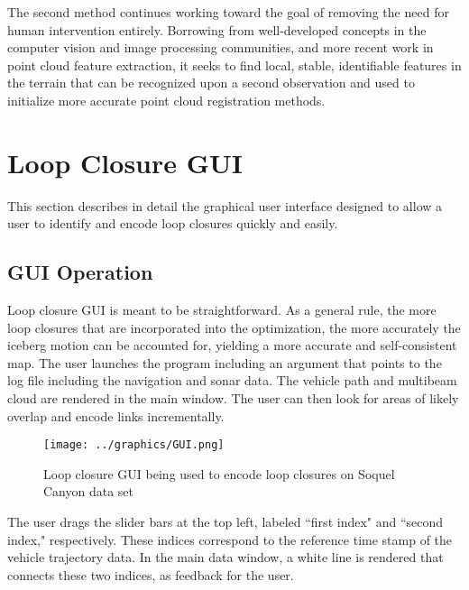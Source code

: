 The second method continues working toward the goal of removing the need for human intervention entirely. Borrowing from well-developed concepts in the computer vision and image processing communities, and more recent work in point cloud feature extraction, it seeks to find local, stable, identifiable features in the terrain that can be recognized upon a second observation and used to initialize more accurate point cloud registration methods. 

\section{Loop Closure GUI}
\label{sec:GUI}

This section describes in detail the graphical user interface designed to allow a user to identify and encode loop closures quickly and easily. 

\subsection{GUI Operation}

Loop closure GUI is meant to be straightforward. As a general rule, the more loop closures that are incorporated into the optimization, the more accurately the iceberg motion can be accounted for, yielding a more accurate and self-consistent map. The user launches the program including an argument that points to the log file including the navigation and sonar data. The vehicle path and multibeam cloud are rendered in the main window. The user can then look for areas of likely overlap and encode links incrementally.

 \begin{figure}[htbp]
   \centering
   \texttt{[image: ../graphics/GUI.png]} %
   \caption{Loop closure GUI being used to encode loop closures on Soquel Canyon data set }
   \label{fig:GUI}
\end{figure}

The user drags the slider bars at the top left, labeled ``first index" and ``second index," respectively. These indices correspond to the reference time stamp of the vehicle trajectory data. In the main data window, a white line is rendered that connects these two indices, as feedback for the user. 

